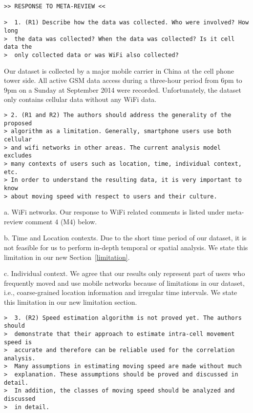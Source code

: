 \newpage
\begin{verbatim}
>> RESPONSE TO META-REVIEW <<

>  1. (R1) Describe how the data was collected. Who were involved? How long
>  the data was collected? When the data was collected? Is it cell data the
>  only collected data or was WiFi also collected?
\end{verbatim}

Our dataset is collected by a major mobile carrier in China at the cell phone tower side. All active GSM data access during a three-hour period from 6pm to 9pm on a Sunday at September 2014 were recorded. Unfortunately, the dataset only contains cellular data without any WiFi data. 


\begin{verbatim}
> 2. (R1 and R2) The authors should address the generality of the proposed
> algorithm as a limitation. Generally, smartphone users use both cellular
> and wifi networks in other areas. The current analysis model excludes
> many contexts of users such as location, time, individual context, etc.
> In order to understand the resulting data, it is very important to know
> about moving speed with respect to users and their culture.
\end{verbatim}

a. WiFi networks.
Our response to WiFi related comments is listed under meta-review comment 4 (M4) below.

b. Time and Location contexts.
Due to the short time period of our dataset, it is not feasible for us to perform in-depth temporal or spatial analysis. We state this limitation in our new Section~\ref{limitation}.


c. Individual context.
We agree that our results only represent part of users who frequently moved and use mobile networks because of limitations in our dataset, i.e., coarse-grained location information and irregular time intervals. We state this limitation in our new limitation section.


\begin{verbatim}
>  3. (R2) Speed estimation algorithm is not proved yet. The authors should
>  demonstrate that their approach to estimate intra-cell movement speed is
>  accurate and therefore can be reliable used for the correlation analysis.
>  Many assumptions in estimating moving speed are made without much
>  explanation. These assumptions should be proved and discussed in detail.
>  In addition, the classes of moving speed should be analyzed and discussed
>  in detail.
\end{verbatim}

